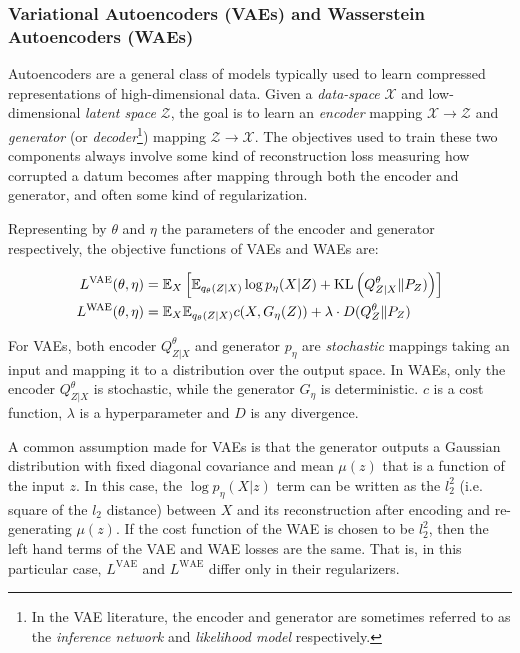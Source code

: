 \subsubsection{Variational Autoencoders (VAEs) and Wasserstein Autoencoders (WAEs)}\label{appendix:intro-vae-wae}

Autoencoders are a general class of models typically used to learn compressed representations of high-dimensional data.
Given a \emph{data-space} $\mathcal{X}$ and low-dimensional \emph{latent space} $\mathcal{Z}$, the goal is to learn an \emph{encoder} mapping $\mathcal{X}\to\mathcal{Z}$ and \emph{generator} (or \emph{decoder}\footnote{In the VAE literature, the encoder and generator are sometimes referred to as the \emph{inference network} and \emph{likelihood model} respectively.}) mapping $\mathcal{Z}\to\mathcal{X}$.
The objectives used to train these two components always involve some kind of reconstruction loss measuring how corrupted a datum becomes after mapping through both the encoder and generator, and often some kind of regularization.

Representing by $\theta$ and $\eta$ the parameters of the encoder and generator respectively, the objective functions of VAEs and WAEs are:

\begin{align*}
    L^{\text{VAE}}(\theta, \eta) &= \mathbb{E}_X \left[ \mathbb{E}_{q_\theta(Z|X)} \log p_\eta(X|Z) + \mathrm{KL}\left( Q^\theta_{Z|X} \| P_Z) \right) \right]\\
    L^{\text{WAE}}(\theta, \eta) &= \mathbb{E}_X \mathbb{E}_{q_\theta(Z|X)} c(X, G_\eta(Z)) + \lambda \cdot D(Q^\theta_Z \| P_Z)
\end{align*}

For VAEs, both encoder $Q^\theta_{Z|X}$ and generator $p_\eta$ are \emph{stochastic} mappings taking an input and mapping it to a distribution over the output space.
In WAEs, only the encoder $Q^\theta_{Z|X}$ is stochastic, while the generator $G_\eta$ is deterministic.
$c$ is a cost function, $\lambda$ is a hyperparameter and $D$ is any divergence.

A common assumption made for VAEs is that the generator outputs a Gaussian distribution with fixed diagonal covariance and mean $\mu(z)$ that is a function of the input $z$.
In this case, the $\log p_\eta(X|z)$ term can be written as the $l^2_2$ (i.e. square of the $l_2$ distance) between $X$ and its reconstruction after encoding and re-generating $\mu(z)$.
If the cost function of the WAE is chosen to be $l^2_2$, then the left hand terms of the VAE and WAE losses are the same. 
That is, in this particular case, $L^{\text{VAE}}$ and $L^{\text{WAE}}$ differ only in their regularizers.

